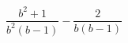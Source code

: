 \begin{ex}[type=expression]
	\begin{condition}
		\(\dfrac{b^2+1}{b^2(b-1)}-\dfrac{2}{b(b-1)}\)
	\end{condition}
\end{ex}